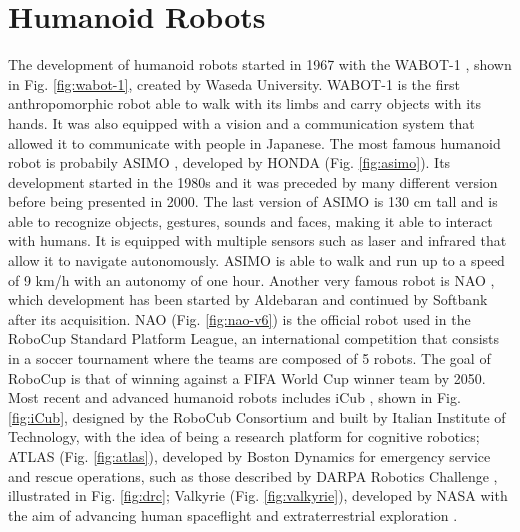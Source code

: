 \section{Humanoid Robots}
The development of humanoid robots started in 1967 with the WABOT-1
\cite{Kato1973TheWABOT1AI}, shown in Fig. \ref{fig:wabot-1}, created by Waseda
University. WABOT-1 is
the first anthropomorphic robot able to 
walk with its limbs and carry objects with its hands. It was also equipped with 
a vision and a communication system that allowed it to communicate with people 
in Japanese. The most famous humanoid robot is probabily ASIMO
\cite{Sakagami2002TheIntelligentASIMO}, developed by HONDA (Fig.
\ref{fig:asimo}). Its development started in the
1980s and it was preceded by many different version before being presented in
2000.
The last version of ASIMO is 130 cm tall and is able to recognize objects,
gestures, sounds and 
faces, making it able to interact with humans. It is equipped with multiple 
sensors such as laser and infrared that allow it to navigate autonomously. 
ASIMO is able to walk and run up to a speed of 9 km/h with an 
autonomy of one hour. Another very famous robot is NAO \cite{NAOdesign},
which development has been started by Aldebaran and continued by Softbank after 
its acquisition. NAO (Fig. \ref{fig:nao-v6}) is the official robot used in 
the RoboCup \cite{Kitano1997RoboCup} Standard Platform League, an international
competition that consists in a soccer tournament where the teams are composed 
of 5 robots. The goal of RoboCup is that of winning against a FIFA
World Cup winner team by 2050. Most recent and advanced humanoid robots 
includes iCub \cite{Sandini2007iCub}, shown in Fig. \ref{fig:iCub}, designed 
by the RoboCub Consortium and built by Italian Institute of Technology,
with the idea of being a research platform for cognitive robotics;
ATLAS (Fig. \ref{fig:atlas}), developed by Boston Dynamics for emergency service
and rescue operations, such as those described by DARPA Robotics Challenge
\cite{Atkenson2018DARPARoboticsChallengeFinals}, illustrated in Fig.
\ref{fig:drc}; Valkyrie (Fig. \ref{fig:valkyrie}), developed by NASA with the 
aim of advancing human spaceflight and extraterrestrial exploration
\cite{Radford2015Valkyrie}.

